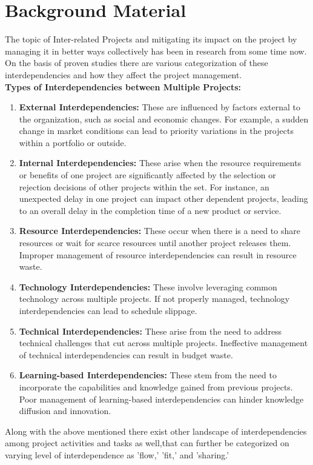 \documentclass{llncs}
\begin{document}
\section{Background Material}
The topic of Inter-related Projects and mitigating its impact on the project by managing it in better ways collectively has been in research from some time now. On the basis of proven studies there are various categorization of these interdependencies and how they affect the project management. \\
\textbf{Types of Interdependencies between Multiple Projects:}
\begin{enumerate}
\item \textbf{External Interdependencies:} These are influenced by factors external to the organization, such as social and economic changes. For example, a sudden change in market conditions can lead to priority variations in the projects within a portfolio or outside.~\cite{refpaper2}
\item \textbf{Internal Interdependencies:} These arise when the resource requirements or benefits of one project are significantly affected by the selection or rejection decisions of other projects within the set. For instance, an unexpected delay in one project can impact other dependent projects, leading to an overall delay in the completion time of a new product or service.~\cite{refpaper2}
\item \textbf{Resource Interdependencies:} These occur when there is a need to share resources or wait for scarce resources until another project releases them. Improper management of resource interdependencies can result in resource waste.~\cite{refpaper2}
\item\textbf{Technology Interdependencies:} These involve leveraging common technology across multiple projects. If not properly managed, technology interdependencies can lead to schedule slippage.~\cite{refpaper2}
\item \textbf{Technical Interdependencies:} These arise from the need to address technical challenges that cut across multiple projects. Ineffective management of technical interdependencies can result in budget waste. \item\textbf{Learning-based Interdependencies:} These stem from the need to incorporate the capabilities and knowledge gained from previous projects. Poor management of learning-based interdependencies can hinder knowledge diffusion and innovation.~\cite{refpaper2}
\end{enumerate}
Along with the above mentioned there exist other landscape of interdependencies among project activities and tasks as well,that can further be categorized on varying level of interdependence as  'flow,' 'fit,' and 'sharing.'~\cite{refpaper5} \\
\end{document}
